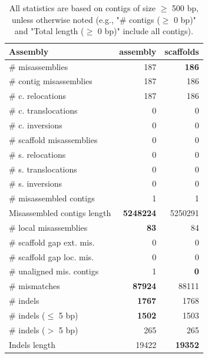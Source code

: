 \documentclass[12pt,a4paper]{article}
\begin{document}
\begin{table}[ht]
\begin{center}
\caption{All statistics are based on contigs of size $\geq$ 500 bp, unless otherwise noted (e.g., "\# contigs ($\geq$ 0 bp)" and "Total length ($\geq$ 0 bp)" include all contigs).}
\begin{tabular}{|l*{2}{|r}|}
\hline
Assembly & assembly & scaffolds \\ \hline
\# misassemblies & 187 & {\bf 186} \\ \hline
\hspace{2mm}\# contig misassemblies & 187 & 186 \\ \hline
\hspace{5mm}\# c. relocations & 187 & 186 \\ \hline
\hspace{5mm}\# c. translocations & 0 & 0 \\ \hline
\hspace{5mm}\# c. inversions & 0 & 0 \\ \hline
\hspace{2mm}\# scaffold misassemblies & 0 & 0 \\ \hline
\hspace{5mm}\# s. relocations & 0 & 0 \\ \hline
\hspace{5mm}\# s. translocations & 0 & 0 \\ \hline
\hspace{5mm}\# s. inversions & 0 & 0 \\ \hline
\# misassembled contigs & 1 & 1 \\ \hline
Misassembled contigs length & {\bf 5248224} & 5250291 \\ \hline
\# local misassemblies & {\bf 83} & 84 \\ \hline
\# scaffold gap ext. mis. & 0 & 0 \\ \hline
\# scaffold gap loc. mis. & 0 & 0 \\ \hline
\# unaligned mis. contigs & 1 & {\bf 0} \\ \hline
\# mismatches & {\bf 87924} & 88111 \\ \hline
\# indels & {\bf 1767} & 1768 \\ \hline
\hspace{5mm}\# indels ($\leq$ 5 bp) & {\bf 1502} & 1503 \\ \hline
\hspace{5mm}\# indels ($>$ 5 bp) & 265 & 265 \\ \hline
Indels length & 19422 & {\bf 19352} \\ \hline
\end{tabular}
\end{center}
\end{table}
\end{document}
